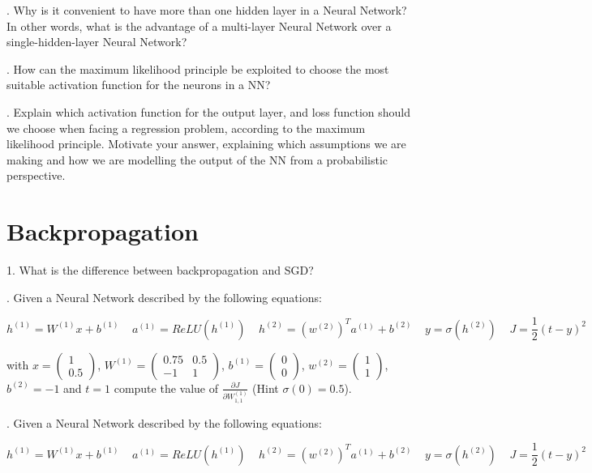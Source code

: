 . Why is it convenient to have more than one hidden layer in a Neural Network? In other words, what is the advantage of a multi-layer Neural Network over a single-hidden-layer Neural Network?

. How can the maximum likelihood principle be exploited to choose the most suitable activation function for the neurons in a NN?

. Explain which activation function for the output layer, and loss function should we choose when facing a regression problem, according to the maximum likelihood principle. Motivate your answer, explaining which assumptions we are making and how we are modelling the output of the NN from a probabilistic perspective.

\section{Backpropagation}


1. What is the difference between backpropagation and SGD?

. Given a Neural Network described by the following equations:

$$ h^{(1)} = W^{(1)}x + b^{(1)}  ~~~~~ a^{(1)} = ReLU(h^{(1)}) ~~~~~ h^{(2)} = (w^{(2)})^{T} a^{(1)} + b^{(2)} ~~~~~ y = \sigma(h^{(2)}) ~~~~~ J = \frac{1}{2} \left ( t - y \right)^{2} $$

\noindent with $ x = \begin{pmatrix} 1 \\ 0.5 \end{pmatrix} $, $ W^{(1)} = \begin{pmatrix} 0.75 & 0.5 \\ -1 & 1  \end{pmatrix} $, $ b^{(1)} = \begin{pmatrix} 0 \\ 0 \end{pmatrix} $, $w^{(2)} = \begin{pmatrix} 1 \\ 1 \end{pmatrix}$, $b^{(2)} = -1$ and $ t=1 $ compute the value of $ \frac{\partial J}{\partial W_{1, 1}^{(1)}} $ (Hint $\sigma (0) = 0.5$).



. Given a Neural Network described by the following equations:

$$ h^{(1)} = W^{(1)}x + b^{(1)}  ~~~~~ a^{(1)} = ReLU(h^{(1)}) ~~~~~ h^{(2)} = (w^{(2)})^{T} a^{(1)} + b^{(2)} ~~~~~ y = \sigma(h^{(2)}) ~~~~~ J = \frac{1}{2} \left ( t - y \right)^{2} $$


